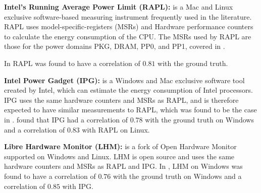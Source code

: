 \noindent\textbf{Intel's Running Average Power Limit (RAPL):} is a Mac and Linux exclusive software-based measuring instrument frequently used in the literature.\cite{biksbois} RAPL uses model-specific-registers (MSRs) and Hardware performance counters to calculate the energy consumption of the CPU. The MSRs used by RAPL are those for the power domains PKG, DRAM, PP0, and PP1, covered in \cite{biksbois}. 

In \cite{biksbois} RAPL was found to have a correlation of $0.81$ with the ground truth.\cite{biksbois}\newline

\noindent\textbf{Intel Power Gadget (IPG):} is a Windows and Mac exclusive software tool created by Intel, which can estimate the energy consumption of Intel processors. %
IPG uses the same hardware counters and MSRs as RAPL\cite{FireFox}, and is therefore expected to have similar measurements to RAPL, which was found to be the case in \cite{biksbois}. \cite{biksbois} found that IPG had a correlation of $0.78$ with the ground truth on Windows and a correlation of $0.83$ with RAPL on Linux.\cite{biksbois}\newline





\noindent\textbf{Libre Hardware Monitor (LHM):} is a fork of Open Hardware Monitor supported on Windows and Linux.\cite{LHM} LHM is open source and uses the same hardware counters and MSRs as RAPL and IPG. %
In \cite{biksbois}, LHM on Windows was found to have a correlation of $0.76$ with the ground truth on Windows and a correlation of $0.85$ with IPG.\newline

